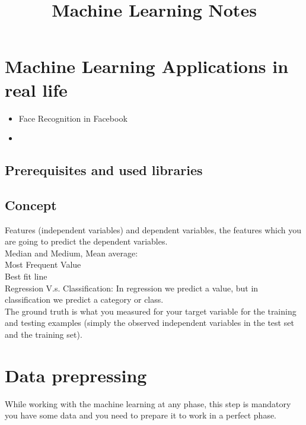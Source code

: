 \documentclass{article}
\title{\textbf{Machine Learning Notes}}
\author{}
\date{}
\begin{document}
\maketitle
\tableofcontents{}
\section{Machine Learning Applications in real life}
\begin{itemize}
  \item Face Recognition in Facebook
  \item 
\end{itemize}

\subsection{Prerequisites and used libraries}

\subsection{Concept}
Features (independent variables) and dependent variables, the features which you are going to predict the dependent variables.\\
Median and Medium, Mean average:\\
Most Frequent Value\\
Best fit line\\
Regression V.s. Classification:
In regression we predict a value, but in classification we predict a category or class.\\
The ground truth is what you measured for your target variable for the training and testing examples (simply the observed independent variables in the test set and the training set).\\

\section{Data prepressing}
While working with the machine learning at any phase, this step is mandatory you have some data and you need to prepare it to work in a perfect phase.\\


\end{document}

